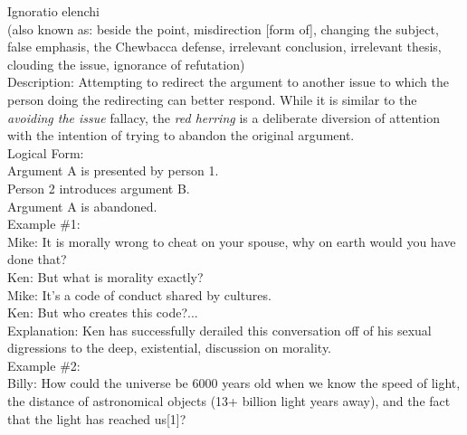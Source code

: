 \documentclass[a4paper,12pt,single,pdftex]{scrartcl}
\begin{document}
{    
    

    
      
        Ignoratio elenchi
      \\

      
        (also known as: beside the point, misdirection [form of], changing the subject, false emphasis, the Chewbacca defense, irrelevant conclusion, irrelevant thesis, clouding the issue, ignorance of refutation)
      \\

      
        Description: Attempting to redirect the argument to another issue to which the person doing the redirecting can better respond. While it is similar to the {\it avoiding the issue} fallacy, the {\it red herring }is a deliberate diversion of attention with the intention of trying to abandon the original argument.
      \\

      
        Logical Form:
      \\

      
        Argument A is presented by person 1.
      \\

      
        Person 2 introduces argument B.
      \\

      
        Argument A is abandoned.
      \\

      
        Example \#1:
      \\

      
        Mike: It is morally wrong to cheat on your spouse, why on earth would you have done that?
      \\

      
        Ken: But what is morality exactly?
      \\

      
        Mike: It’s a code of conduct shared by cultures.
      \\

      
        Ken: But who creates this code?...
      \\

      
        Explanation: Ken has successfully derailed this conversation off of his sexual digressions to the deep, existential, discussion on morality.
      \\

      
        Example \#2:
      \\

      
        Billy: How could the universe be 6000 years old when we know the speed of light, the distance of astronomical objects (13+ billion light years away), and the fact that the light has reached us[1]?
      \\

}
\end{document}
